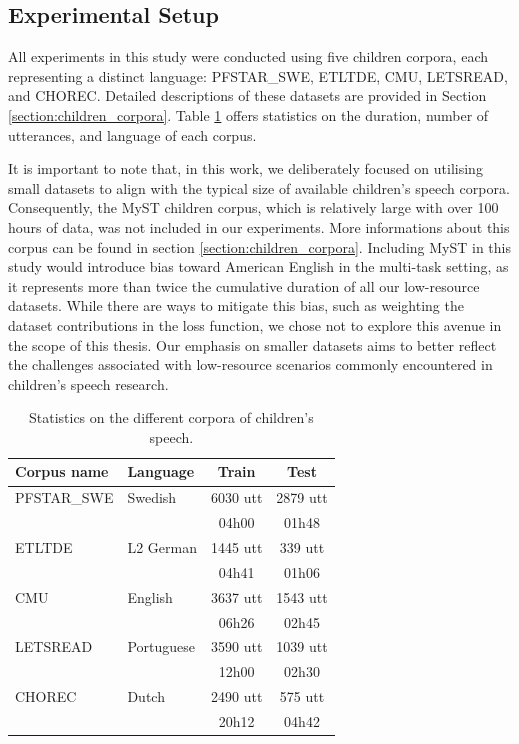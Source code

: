 \subsection{Experimental Setup}
\label{section:corpus}
All experiments in this study were conducted using five children corpora, each representing a distinct language: PFSTAR\_SWE, ETLTDE, CMU, LETSREAD, and CHOREC. Detailed descriptions of these datasets are provided in Section \ref{section:children_corpora}. Table \ref{tab:statistics2} offers statistics on the duration, number of utterances, and language of each corpus.

It is important to note that, in this work, we deliberately focused on utilising small datasets to align with the typical size of available children's speech corpora. Consequently, the MyST children corpus, which is relatively large with over 100 hours of data, was not included in our experiments. More informations about this corpus can be found in section \ref{section:children_corpora}. Including MyST in this study would introduce bias toward American English in the multi-task setting, as it represents more than twice the cumulative duration of all our low-resource datasets. While there are ways to mitigate this bias, such as weighting the dataset contributions in the loss function, we chose not to explore this avenue in the scope of this thesis. Our emphasis on smaller datasets aims to better reflect the challenges associated with low-resource scenarios commonly encountered in children's speech research.


\begin{table}[ht]
\begin{center}
\begin{tabular}{llcc}
\hline
Corpus name & Language     & Train & Test  \\ \hline
\multicolumn{1}{l}{PFSTAR\_SWE} & Swedish             & 6030 utt  & 2879 utt  \\ 
\multicolumn{1}{l}{} &              & 04h00 & 01h48 \\\hline
\multicolumn{1}{l}{ETLTDE}      & L2 German   & 1445 utt &  339 utt \\ 
\multicolumn{1}{l}{}      &    &  04h41 & 01h06 \\ \hline
\multicolumn{1}{l}{CMU}         & English             & 3637 utt & 1543 utt \\ 
\multicolumn{1}{l}{}         &              & 06h26 & 02h45  \\ \hline
\multicolumn{1}{l}{LETSREAD}    & Portuguese & 3590 utt & 1039 utt \\ 
\multicolumn{1}{l}{}    &  & 12h00 & 02h30 \\  \hline
\multicolumn{1}{l}{CHOREC}      & Dutch               & 2490 utt & 575 utt  \\ 
\multicolumn{1}{l}{}      &                &  20h12 & 04h42 \\ \hline
\end{tabular}
\caption{Statistics on the different corpora of children's speech.}
\label{tab:statistics2}
\end{center}
\end{table}


